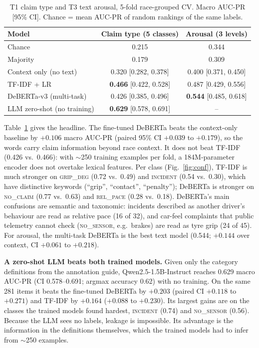 \begin{table}[t]
\centering
\caption{T1 claim type and T3 text arousal, 5-fold race-grouped CV. Macro AUC-PR [95\% CI]. Chance = mean AUC-PR of random rankings of the same labels.}
\label{tab:t1}
\begin{tabular}{lcc}
\toprule
Model & Claim type (5 classes) & Arousal (3 levels) \\
\midrule
Chance & 0.215 & 0.344 \\
Majority & 0.179 & 0.309 \\
Context only (no text) & 0.320 [0.282, 0.378] & 0.400 [0.371, 0.450] \\
TF-IDF + LR & \textbf{0.466} [0.422, 0.528] & 0.487 [0.429, 0.556] \\
DeBERTa-v3 (multi-task) & 0.426 [0.385, 0.496] & \textbf{0.544} [0.485, 0.618] \\
\midrule
LLM zero-shot (no training) & \textbf{0.629} [0.578, 0.691] & -- \\
\bottomrule
\end{tabular}
\end{table}
Table~\ref{tab:t1} gives the headline. The fine-tuned DeBERTa beats the context-only baseline by $+0.106$ macro AUC-PR (paired 95\% CI $+0.039$ to $+0.179$), so the words carry claim information beyond race context. It does not beat TF-IDF (0.426 vs.\ 0.466): with $\sim$250 training examples per fold, a 184M-parameter encoder does not overtake lexical features. Per class (Fig.~\ref{fig:conf}), TF-IDF is much stronger on \textsc{grip\_deg} (0.72 vs.\ 0.49) and \textsc{incident} (0.54 vs.\ 0.30), which have distinctive keywords (``grip'', ``contact'', ``penalty''); DeBERTa is stronger on \textsc{no\_claim} (0.77 vs.\ 0.63) and \textsc{rel\_pace} (0.28 vs.\ 0.18). DeBERTa's main confusions are semantic and taxonomic: incidents described as another driver's behaviour are read as relative pace (16 of 32), and car-feel complaints that public telemetry cannot check (\textsc{no\_sensor}, e.g.\ brakes) are read as tyre grip (24 of 45). For arousal, the multi-task DeBERTa is the best text model (0.544; $+0.144$ over context, CI $+0.061$ to $+0.218$).

\textbf{A zero-shot LLM beats both trained models.} Given only the category definitions from the annotation guide, Qwen2.5-1.5B-Instruct reaches 0.629 macro AUC-PR (CI 0.578--0.691; argmax accuracy 0.62) with no training. On the same 281 items it beats the fine-tuned DeBERTa by $+0.203$ (paired CI $+0.118$ to $+0.271$) and TF-IDF by $+0.164$ ($+0.088$ to $+0.230$). Its largest gains are on the classes the trained models found hardest, \textsc{incident} (0.74) and \textsc{no\_sensor} (0.56). Because the LLM sees no labels, leakage is impossible. Its advantage is the information in the definitions themselves, which the trained models had to infer from $\sim$250 examples.

